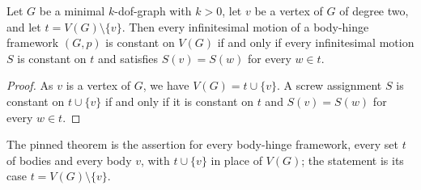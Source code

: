 \begin{lemma}
  \label{lem:case-II}
  \leanok
  Let $G$ be a minimal $k$-dof-graph with $k > 0$, let $v$ be a vertex
  of $G$ of degree two, and let $t = V(G) \setminus \{v\}$. Then every
  infinitesimal motion of a body-hinge framework $(G,p)$ is constant on
  $V(G)$ if and only if every infinitesimal motion $S$ is constant on $t$
  and satisfies $S(v) = S(w)$ for every $w \in t$.
\end{lemma}
\begin{proof}
  \leanok
  As $v$ is a vertex of $G$, we have $V(G) = t \cup \{v\}$. A screw
  assignment $S$ is constant on $t \cup \{v\}$ if and only if it is
  constant on $t$ and $S(v) = S(w)$ for every $w \in t$.
\end{proof}

\begin{fmlnote}
  The pinned theorem is the assertion for every body-hinge framework,
  every set $t$ of bodies and every body $v$, with $t \cup \{v\}$ in
  place of $V(G)$; the statement is its case $t = V(G) \setminus \{v\}$.
\end{fmlnote}


